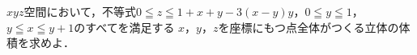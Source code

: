 \documentclass[../../main.tex]{subfiles}
\begin{document}
$xyz$空間において，不等式$0 \leqq z \leqq 1+x+y-3(x-y)y$，$0 \leqq y \leqq 1$，
$y \leqq x \leqq y+1$のすべてを満足する
$x$，$y$，$z$を座標にもつ点全体がつくる立体の体積を求めよ．
\end{document}

